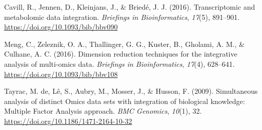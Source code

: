 \documentclass[a4paper, nobind]{templates/ociamthesis}
\newlength{\cslhangindent}
\newenvironment{CSLReferences}[2] %
 {%
  \setlength{\parindent}{0pt}
  \ifodd #1
  \let\oldpar\par
  \def\par{\hangindent=\cslhangindent\oldpar}
  \fi
  \setlength{\parskip}{1mm}
  \setlength{\baselineskip}{6mm}
 }%
 {}
\begin{document}

\hypertarget{refs}{}
\begin{CSLReferences}{1}{0}
\leavevmode{}%
Cavill, R., Jennen, D., Kleinjans, J., \& Briedé, J. J. (2016). Transcriptomic and metabolomic data integration. \emph{Briefings in Bioinformatics}, \emph{17}(5), 891--901. \url{https://doi.org/10.1093/bib/bbv090}

\leavevmode{}%
Meng, C., Zeleznik, O. A., Thallinger, G. G., Kuster, B., Gholami, A. M., \& Culhane, A. C. (2016). Dimension reduction techniques for the integrative analysis of multi-omics data. \emph{Briefings in Bioinformatics}, \emph{17}(4), 628--641. \url{https://doi.org/10.1093/bib/bbv108}

\leavevmode{}%
Tayrac, M. de, Lê, S., Aubry, M., Mosser, J., \& Husson, F. (2009). Simultaneous analysis of distinct {Omics} data sets with integration of biological knowledge: {Multiple} {Factor} {Analysis} approach. \emph{BMC Genomics}, \emph{10}(1), 32. \url{https://doi.org/10.1186/1471-2164-10-32}

\end{CSLReferences}

\end{document}
